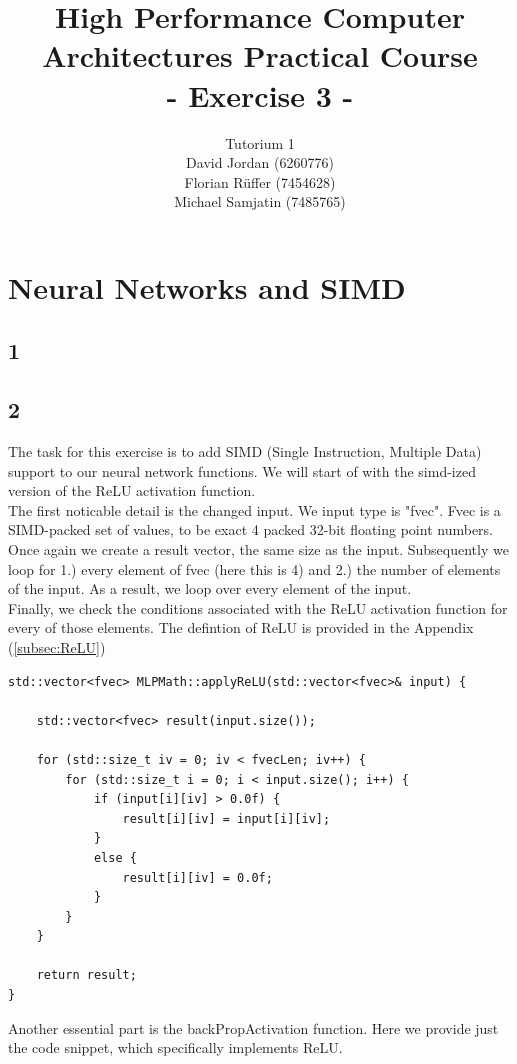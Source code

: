 \documentclass{article}
\title{\textbf{High Performance Computer Architectures Practical Course \\ - Exercise 3 -} \\[10mm]}
\author{Tutorium 1 \\[10mm] David Jordan (6260776) \\[1mm] Florian Rüffer (7454628) \\[1mm] Michael Samjatin (7485765) \\[10mm]}
\begin{document}
\maketitle
\newpage
\section{Neural Networks and SIMD}
\subsection*{1}
\subsection*{2}
The task for this exercise is to add SIMD (Single Instruction, Multiple Data) support to our neural network functions.
We will start of with the simd-ized version of the ReLU activation function. \\

\noindent The first noticable detail is the changed input. We input type is "fvec".
Fvec is a SIMD-packed set of values, to be exact 4 packed 32-bit floating point numbers.
Once again we create a result vector, the same size as the input. Subsequently we loop for 1.) every element of fvec (here this is 4) and 2.)
the number of elements of the input. As a result, we loop over every element of the input. \\

\noindent Finally, we check the conditions associated with the ReLU activation function for every of those elements.
The defintion of ReLU is provided in the Appendix (\hyperref[subsec:ReLU]{{\ref*{subsec:ReLU}}})


\begin{lstlisting}[caption=SIMD-ized ReLU]
    std::vector<fvec> MLPMath::applyReLU(std::vector<fvec>& input) {

    std::vector<fvec> result(input.size());

    for (std::size_t iv = 0; iv < fvecLen; iv++) {
        for (std::size_t i = 0; i < input.size(); i++) {
            if (input[i][iv] > 0.0f) {
                result[i][iv] = input[i][iv];
            }
            else {
                result[i][iv] = 0.0f;
            }
        }
    }
    
    return result;
}
\end{lstlisting}

\newpage
\noindent Another essential part is the backPropActivation function.
Here we provide just the code snippet, which specifically implements ReLU. \\
\end{document}
